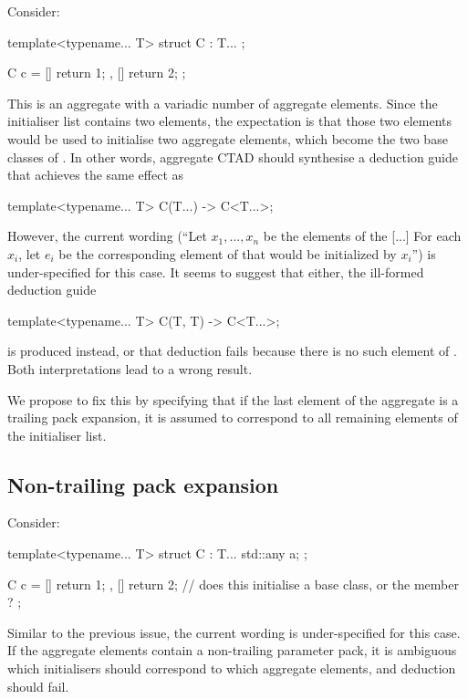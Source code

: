 Consider:

\begin{codeblock}
template<typename... T> 
struct C : T... {};

C c = { 
  []{ return 1; }, 
  []{ return 2; } 
};
\end{codeblock}

This is an aggregate with a variadic number of aggregate elements. Since the initialiser list contains two elements, the expectation is that those two elements would be used to initialise two aggregate elements, which become the two base classes of . In other words, aggregate CTAD should synthesise a deduction guide that achieves the same effect as

\begin{codeblock}
template<typename... T> 
C(T...) -> C<T...>;
\end{codeblock}

However, the current wording (``Let $x_1, ..., x_n$ be the elements of the  [...] For each $x_i$, let $e_i$ be the corresponding element of  that would be initialized by $x_i$'') is under-specified for this case. It seems to suggest that either, the ill-formed deduction guide

\begin{codeblock}
template<typename... T> 
C(T, T) -> C<T...>;
\end{codeblock}

is produced instead, or that deduction fails because there is no such element of . Both interpretations lead to a wrong result.

We propose to fix this by specifying that if the last element of the aggregate is a trailing pack expansion, it is assumed to correspond to all remaining elements of the initialiser list.

\subsection{Non-trailing pack expansion}
Consider:

\begin{codeblock}
template<typename... T> 
struct C : T... {
  std::any a;
};

C c = { 
  []{ return 1; }, 
  []{ return 2; } // does this initialise a base class, or the member ?
};
\end{codeblock}

Similar to the previous issue, the current wording is under-specified for this case. If the aggregate elements contain a non-trailing parameter pack, it is ambiguous which initialisers should correspond to which aggregate elements, and deduction should fail. 

